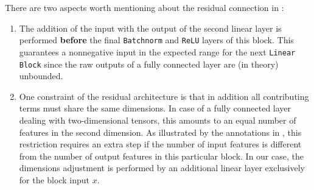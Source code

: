 There are two aspects worth mentioning about the residual connection in :
\begin{enumerate}
  \item The addition of the input with the output of the second linear layer is performed \textbf{before} the final \texttt{Batchnorm} and \texttt{ReLU} layers of this block.
        This guarantees a nonnegative input in the expected range for the next \texttt{Linear Block} since the raw outputs of a fully connected layer are (in theory) unbounded.

  \item One constraint of the residual architecture is that in addition all contributing terms must share the same dimensions.
        In case of a fully connected layer dealing with two-dimensional tensors, this amounts to an equal number of features in the second dimension.
        As illustrated by the annotations in , this restriction requires an extra step if the number of input features is different from the number of output features in this particular block.
        In our case, the dimensions adjustment is performed by an additional linear layer exclusively for the block input $x$.
\end{enumerate}

